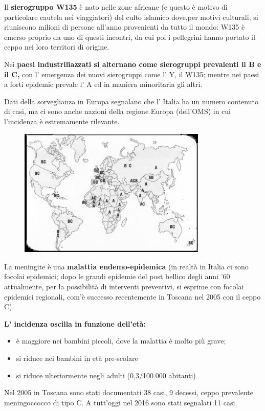   Il \textbf{sierogruppo W135} è nato nelle zone africane (e questo è
  motivo di particolare cautela nei viaggiatori) del culto islamico
  dove,per motivi culturali, si riuniscono milioni di persone all'anno
  provenienti da tutto il mondo: W135 è emerso proprio da uno di questi
  incontri, da cui poi i pellegrini hanno portato il ceppo nei loro
  territori di origine.

  Nei \textbf{paesi industriliazzati si alternano come sierogruppi
  prevalenti il B e il C,} con l' emergenza dei nuovi sierogruppi come
  l' Y, il W135; mentre nei paesi a forti epidemie prevale l' A ed in
  maniera minoritaria gli altri.

  Dati della sorveglianza in Europa segnalano che l' Italia ha un numero
  contenuto di casi, ma ci sono anche nazioni della regione Europa
  (dell'OMS) in cui l'incidenza è estremamente rilevante.

\begin{figure}[!ht]
\centering
	\includegraphics[width=0.8\textwidth]{08/image3.jpg}
	\end{figure}

  La meningite è una \textbf{malattia endemo-epidemica} (in realtà in
  Italia ci sono focolai epidemici; dopo le grandi epidemie del post
  bellico degli anni '60 attualmente, per la possibilità di interventi
  preventivi, si esprime con focolai epidemici regionali, com'è successo
  recentemente in Toscana nel 2005 con il ceppo C).

  \textbf{L' incidenza oscilla in funzione dell'età: }

\begin{itemize}
\item
  è maggiore nei bambini piccoli, dove la malattia è molto più grave;
\item
  si riduce nei bambini in età pre-scolare
\item
  si riduce ulteriormente negli adulti (0,3/100.000 abitanti)
\end{itemize}
  Nel 2005 in Toscana sono stati documentati 38 casi, 9 decessi, ceppo
  prevalente meningoccocco di tipo C. A tutt'oggi nel 2016 sono stati
  segnalati 11 casi.

